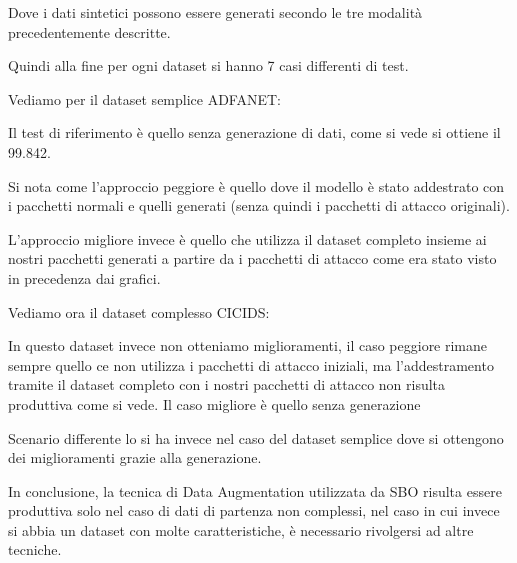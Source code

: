 \documentclass[11pt]{article}
\begin{document}
Dove i dati sintetici possono essere generati secondo le tre modalità precedentemente descritte.

Quindi alla fine per ogni dataset si hanno 7 casi differenti di test.

Vediamo per il dataset semplice ADFANET:

Il test di riferimento è quello senza generazione di dati, come si vede si ottiene il 99.842.

Si nota come l'approccio peggiore è quello dove il modello è stato addestrato con i pacchetti normali e quelli generati (senza quindi i pacchetti di attacco originali). 

L'approccio migliore invece è quello che utilizza il dataset completo insieme ai nostri pacchetti generati a partire da i pacchetti di attacco come era stato visto in precedenza dai grafici.

Vediamo ora il dataset complesso CICIDS:

In questo dataset invece non otteniamo miglioramenti, il caso peggiore rimane sempre quello ce non utilizza i pacchetti di attacco iniziali, ma l'addestramento tramite il dataset completo con i nostri pacchetti di attacco non risulta produttiva come si vede. Il caso migliore è quello senza generazione

Scenario differente lo si ha invece nel caso del dataset semplice dove si ottengono dei miglioramenti grazie alla generazione. 

In conclusione, la tecnica di Data Augmentation utilizzata da SBO risulta essere produttiva solo nel caso di dati di partenza non complessi, nel caso in cui invece si abbia un dataset con molte caratteristiche, è necessario rivolgersi ad altre tecniche.
\end{document}
